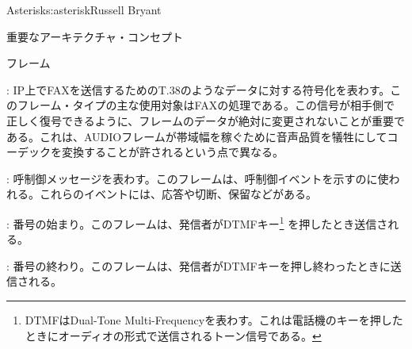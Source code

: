 \begin{aosachapter}{Asterisk}{s:asterisk}{Russell Bryant}
\begin{aosasect1}{重要なアーキテクチャ・コンセプト}
\begin{aosasect2}{フレーム}
\begin{aosaitemize}
  \item {}: IP上でFAXを送信するためのT.38のようなデータに対する符号化を表わす\@。このフレーム・タイプの主な使用対象はFAXの処理である。この信号が相手側で正しく復号できるように、フレームのデータが絶対に変更されないことが重要である。これは、AUDIOフレームが帯域幅を稼ぐために音声品質を犠牲にしてコーデックを変換することが許されるという点で異なる。

  \item {}: 呼制御メッセージを表わす。このフレームは、呼制御イベントを示すのに使われる。これらのイベントには、応答や切断、保留などがある。

  \item {}: 番号の始まり。このフレームは、発信者がDTMFキー\footnote{DTMFはDual-Tone Multi-Frequencyを表わす。これは電話機のキーを押したときにオーディオの形式で送信されるトーン信号である。} を押したとき送信される。

  \item {}: 番号の終わり。このフレームは、発信者がDTMFキーを押し終わったときに送信される。

\end{aosaitemize}


\end{aosasect2}
\end{aosasect1}
\end{aosachapter}
